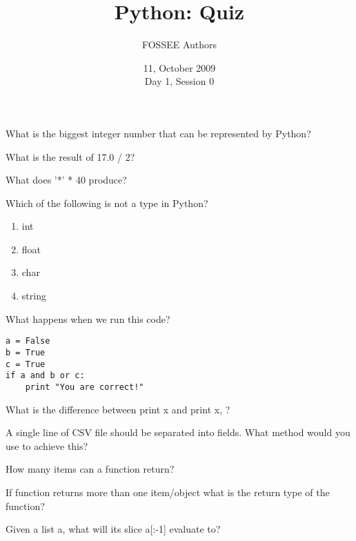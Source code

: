\documentclass[14pt,compress]{beamer}
\title[Basic Python]{Python: Quiz}
\author[FOSSEE Team] {FOSSEE Authors}
\institute[IIT Bombay] {Department of Aerospace Engineering\\IIT Bombay}
\date[] {11, October 2009\\Day 1, Session 0}
\begin{document}
\begin{frame}
  \titlepage
\end{frame}

\begin{frame}{}
  What is the biggest integer number that can be represented by Python?
\end{frame}

\begin{frame}{}
  What is the result of 17.0 / 2?
\end{frame}

\begin{frame}{}
  What does '*' * 40 produce?
\end{frame}

\begin{frame}{}
  Which of the following is not a type in Python?
  \begin{enumerate}
    \item int
    \item float
    \item char
    \item string
  \end{enumerate}
\end{frame}

\begin{frame}[fragile]{}
  What happens when we run this code?
  \begin{lstlisting}
a = False
b = True
c = True
if a and b or c:
    print "You are correct!"
  \end{lstlisting}
\end{frame}

\begin{frame}{}
  What is the difference between print x and print x, ?
\end{frame}

\begin{frame}{}
  A single line of CSV file should be separated into fields. What method would you use to achieve this?
\end{frame}

\begin{frame}{}
  How many items can a function return?
\end{frame}

\begin{frame}{}
  If function returns more than one item/object what is the return type of the function?
\end{frame}

\begin{frame}{}
  Given a list a, what will its slice a[:-1] evaluate to?
\end{frame}
\end{document}
